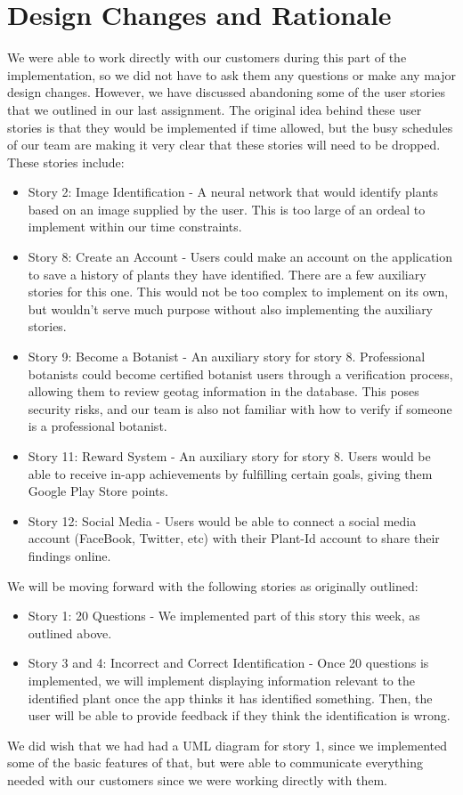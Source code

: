 \documentclass[a4paper]{article}
\begin{document}
\section{Design Changes and Rationale}
We were able to work directly with our customers during this part of the implementation, so we did not have to ask them any questions or make any major design changes. However, we have discussed abandoning some of the user stories that we outlined in our last assignment. The original idea behind these user stories is that they would be implemented if time allowed, but the busy schedules of our team are making it very clear that these stories will need to be dropped. These stories include: 
\begin{itemize}
\item Story 2: Image Identification - A neural network that would identify plants based on an image supplied by the user. This is too large of an ordeal to implement within our time constraints.
\item Story 8: Create an Account - Users could make an account on the application to save a history of plants they have identified. There are a few auxiliary stories for this one. This would not be too complex to implement on its own, but wouldn't serve much purpose without also implementing the auxiliary stories.
\item Story 9: Become a Botanist - An auxiliary story for story 8. Professional botanists could become certified botanist users through a verification process, allowing them to review geotag information in the database. This poses security risks, and our team is also not familiar with how to verify if someone is a professional botanist. 
\item Story 11: Reward System - An auxiliary story for story 8. Users would be able to receive in-app achievements by fulfilling certain goals, giving them Google Play Store points. 
\item Story 12: Social Media - Users would be able to connect a social media account (FaceBook, Twitter, etc) with their Plant-Id account to share their findings online. 
\end{itemize}
We will be moving forward with the following stories as originally outlined: 
\begin{itemize}
\item Story 1: 20 Questions - We implemented part of this story this week, as outlined above.
\item Story 3 and 4: Incorrect and Correct Identification - Once 20 questions is implemented, we will implement displaying information relevant to the identified plant once the app thinks it has identified something. Then, the user will be able to provide feedback if they think the identification is wrong.
\end{itemize}
We did wish that we had had a UML diagram for story 1, since we implemented some of the basic features of that, but were able to communicate everything needed with our customers since we were working directly with them.
\end{document}
